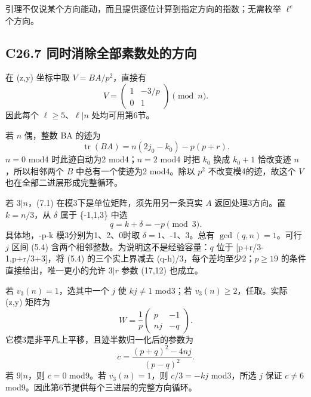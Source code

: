 {引理不仅说某个方向能动，而且提供逐位计算到指定方向的指数；无需枚举} {\ensuremath{\ell ^{e}}} {个方向。}

\subsection*{\texorpdfstring{{C26.7} {同时消除全部素数处的方向}}{C26.7 同时消除全部素数处的方向}}\label{C26-h165}

{在} {(z,y)} {坐标中取} {\ensuremath{V=BA/p^{2}}，直接有} \[
V=\begin{pmatrix}1&-3/p\\0&1\end{pmatrix}\pmod n.
\tag{C26.7.1}
\] {因此每个} {\ensuremath{\ell \ge 5}、\ensuremath{\ell |n}} {处均可用第6节。}

{若} {\ensuremath{n}} {偶，整数} {BA} {的迹为} \[
\operatorname{tr}(BA)=n(2j_0-k_0)-p(p+r).
\tag{C26.7.2}
\] {\ensuremath{n=0}} {mod4} {时此迹自动为2} {mod4；\ensuremath{n=2}} {mod4} {时把} {\ensuremath{k_{0}}} {换成} {\ensuremath{k_{0}+1}} {恰改变迹} {\ensuremath{n}，所以相邻两个} {\ensuremath{B}} {中总有一个使迹为2} {mod4。除以} {\ensuremath{p^{2}}} {不改变模4的迹，故这个} {\ensuremath{V}} {也在全部二进层形成完整循环。}

{若} {\ensuremath{3|n}，(7.1)} {在模3下是单位矩阵，须先用另一条真实} {\ensuremath{A}} {返回处理3方向。置} {\ensuremath{k=n/3}，从} {\ensuremath{\delta }} {属于} {\{-1,1,3\}} {中选} \[
q=k+\delta=-p\pmod3.
\] {具体地，-p-k} {模3分别为1、2、0时取} {\ensuremath{\delta =1}、-1、3。总有} {\ensuremath{\operatorname{gcd}(q,n)=1}。可行} {\ensuremath{j}} {区间} {(5.4)} {含两个相邻整数。为说明这不是经验容量：\ensuremath{q}} {位于} {{[}p+r/3-1,p+r/3+3{]}，将} {(5.4)} {的三个实上界减去} {(q-h)/3，每个差均至少2；\ensuremath{p\ge 19}} {的条件直接给出，唯一更小的允许} {\ensuremath{3|r}} {参数} {(17,12)} {也成立。}

{若} {\ensuremath{v_{3}(n)=1}，选其中一个} {\ensuremath{j}} {使} {\ensuremath{kj\ne 1}} {mod3；若} {\ensuremath{v_{3}(n)\ge 2}，任取。实际} {(z,y)} {矩阵为} \[
W=\frac1p\begin{pmatrix}p&-1\\nj&-q\end{pmatrix}.
\] {它模3是非平凡上平移，且迹半数归一化后的参数为} \[
c=\frac{(p+q)^2-4nj}{(p-q)^2}.
\tag{C26.7.3}
\] {若} {\ensuremath{9|n}，则} {\ensuremath{c=0}} {mod9。若} {\ensuremath{v_{3}(n)=1}，则} {\ensuremath{c/3=-kj}} {mod3，所选} {\ensuremath{j}} {保证} {\ensuremath{c\ne 6}} {mod9。因此第6节提供每个三进层的完整方向循环。}

